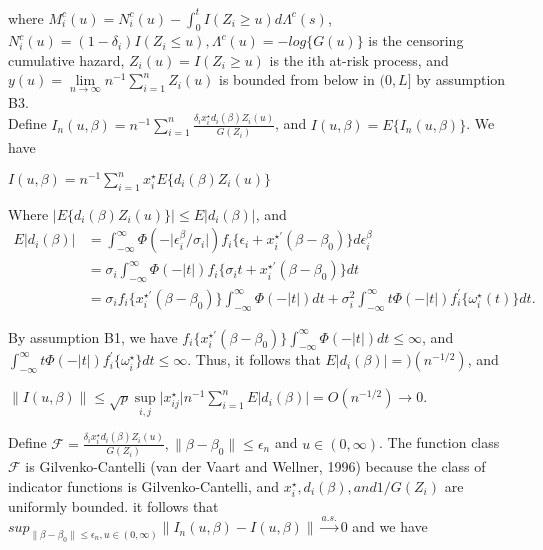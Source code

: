 \documentclass[12pt]{article}
\begin{document}
	\noindent where $M_i^c(u) = N_i^c(u)-\int_{0}^{t}I(Z_i\geq u)d\Lambda^c(s)$, $N_i^c(u)=(1-\delta_i)I(Z_i\leq u), \Lambda^c(u) = -log\{G(u)\}$ is the censoring cumulative hazard, $Z_i(u)=I(Z_i \geq u)$ is the ith at-risk process, and $y(u)=\lim\limits_{n \to \infty} n^{-1} \sum_{i=1}^{n} Z_i(u)$ is bounded from below in $(0,L]$ by assumption B3.\\

	\noindent Define $I_n(u,\beta)=n^{-1} \sum_{i=1}^{n}\frac{\delta_i x_i^\star d_i(\beta)Z_i(u)}{G(Z_i)}$, and $I(u,\beta)=E\{I_n(u,\beta)\}$. We have
	\begin{center}
		$I(u,\beta)=n^{-1} \sum_{i=1}^{n}x_i^\star E\{d_i(\beta)Z_i(u)\}$
	\end{center}
	Where $\lvert E\{d_i(\beta)Z_i(u)\} \rvert \leq E\lvert d_i(\beta) \rvert$, and
	\begin{align*}
		E\lvert d_i(\beta) \rvert & = \int_{-\infty}^{\infty} \Phi(-\lvert\epsilon_i^\beta/\sigma_i\rvert)f_i\{\epsilon_i+x_i^{\star \prime}(\beta-\beta_0)\}d\epsilon_i^\beta\\
		& = \sigma_i \int_{-\infty}^{\infty} \Phi(-\lvert t \rvert)f_i\{\sigma_it+x_i^{\star \prime}(\beta-\beta_0)\}dt\\
		& = \sigma_i f_i\{x_i^{\star \prime}(\beta-\beta_0)\}\int_{-\infty}^{\infty} \Phi (- \lvert t \rvert)dt + \sigma_i^2 \int_{-\infty}^{\infty}t \Phi (- \lvert t \rvert) f_i^\prime \{\omega_i^\star(t) \}dt.
	\end{align*}

\newpage

	By assumption B1, we have $f_i\{x_i^{\star \prime}(\beta-\beta_0) \}\int_{-\infty}^{\infty}\Phi(- \lvert t \rvert)dt \leq \infty$, and \mbox{$\int_{-\infty}^{\infty} t \Phi(- \lvert t \rvert)f_i^\prime\{\omega_i^{\star} \}dt\leq \infty$}. Thus, it follows that $E\lvert d_i(\beta) \rvert=)(n^{-1/2})$, and

	\begin{center}
		$\lVert I(u,\beta) \rVert \leq \sqrt{p} \sup\limits_{i,j} \lvert x_{ij}^{\star} \rvert n^{-1}\sum_{i=1}^{n} E \lvert d_i(\beta) \rvert = O(n^{-1/2}) \to 0$.
	\end{center}

	Define $\mathcal{F}=\frac{\delta_i x_i^\star d_i(\beta) Z_i(u)}{G(Z_i)}, \lVert \beta - \beta_0 \rVert \leq \epsilon_n$ and $u \in (0, \infty)$. The function class $\mathcal{F}$ is Gilvenko-Cantelli (van der Vaart and Wellner, 1996) because the class of indicator functions is Gilvenko-Cantelli, and $x_i^\star, d_i(\beta), and 1/G(Z_i)$ are uniformly bounded. it follows that $sup_{\lVert \beta - \beta_0 \rVert \leq \epsilon_n, u \in (0,\infty)} \lVert I_n(u,\beta)- I(u, \beta) \rVert \xrightarrow{a.s.} 0$ and we have
\end{document}
